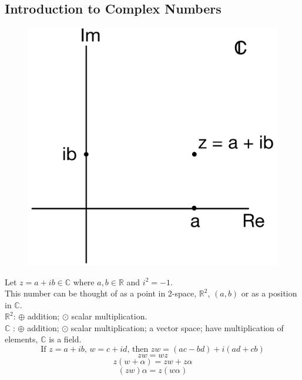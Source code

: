 \documentclass[11pt]{article}
\begin{document}
\subsection{Introduction to Complex Numbers}
\begin{figure}[H]
\includegraphics[scale = 0.13]{1_1}
\centering
\end{figure}
Let $z = a + ib \in \mathbb{C}$ where $a, b \in \mathbb{R}$ and $i ^ 2 = -1$. \\
This number can be thought of as a point in 2-space, $\mathbb{R} ^ 2$, $(a, b)$ or as a position in $\mathbb{C}$. \\ 
$\mathbb{R} ^ 2$: $\oplus$ addition; $\odot$ scalar multiplication. \\
$\mathbb{C}$ : $\oplus$ addition; $\odot$ scalar multiplication; a vector space; have multiplication of elements, $\mathbb{C}$ is a field. \\
\begin{equation*} 
\mbox{If } z = a + ib \mbox{, } w = c + id \mbox{, then }zw = (ac - bd) + i(ad + cb)
\end{equation*}
$$zw = wz$$
$$z(w + \alpha) = zw + z\alpha$$ 
$$(zw)\alpha = z(w\alpha)$$ 
\end{document}

